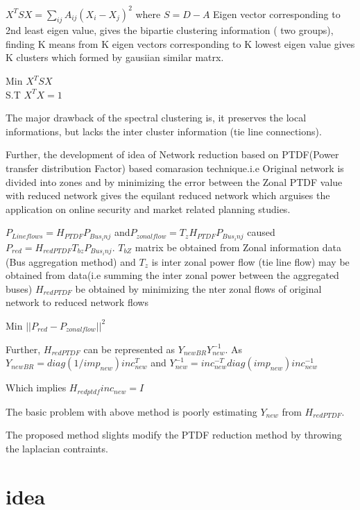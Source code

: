 \documentclass[12pt]{article}
\begin{document}
$X^TSX=\sum_{ij}A_{ij}(X_{i}-X_{j})^2$ where $S=D-A$
Eigen vector corresponding to 2nd least eigen value, gives the bipartie clustering information ( two groups), finding K means from K eigen vectors corresponding to K lowest eigen value gives K clusters which formed by gausiian similar matrx.
\begin{center}
Min $X^TSX$ \\
S.T $X^TX=1$ 
\end{center}
The major drawback of the spectral clustering is, it preserves the local informations, but lacks the inter cluster information (tie line connections).



Further, the development of idea of Network reduction based on PTDF(Power transfer distribution Factor) based comarasion technique.i.e Original network is divided into zones and by minimizing the error between the Zonal PTDF value with reduced network gives the equilant reduced network which arguises the application on online security and market related planning studies.

$P_{Lineflows}=H_{PTDF}P_{Bus _inj}$  and$ P_{zonal flow}=T_{z}H_{PTDF}P_{Bus _inj}$ caused $P_{red}=H_{red PTDF}T_{bz}P_{Bus _inj}$.
$T_{bZ}$ matrix be obtained from Zonal information data (Bus aggregation method) and $T_{z}$ is inter zonal power flow (tie line flow) may be obtained from data(i.e summing the  inter zonal power between the aggregated buses)
$H_{redPTDF}$ be obtained by minimizing the nter zonal flows of original network to reduced network  flows 
\begin{center}
Min  $||P_{red}-P_{zonalflow}||^2$\\
\end{center}

 Further, $H_{redPTDF}$ can be represented as $Y_{newBR}Y_{new}^{-1}$. As $Y_{newBR}=diag(1/imp_{new})inc_{new}^T$ and $Y_{new}^{-1}=inc_{new}^{-T}diag(imp_{new})inc_{new}^{-1}$

Which implies  $H_{redptdf}inc_{new}=I$

The basic problem with above method is poorly estimating $Y_{new}$ from $H_{redPTDF}$. 

The proposed method slights modify the PTDF reduction method by throwing the laplacian contraints.

\section{idea}
\end{document}
